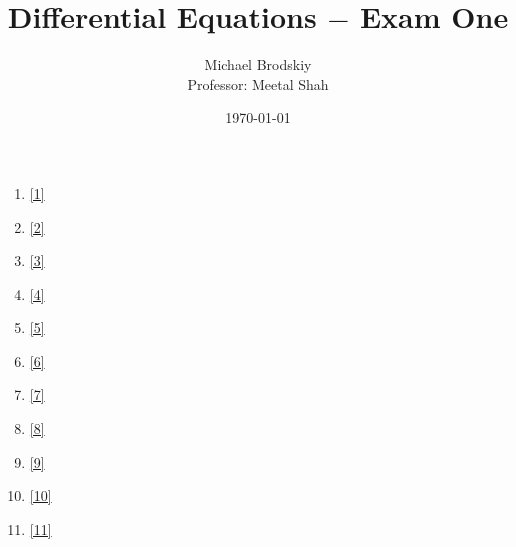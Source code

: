 \documentclass[12pt]{article}
\title{Differential Equations $-$ Exam One}
\date{\today}
\author{Michael Brodskiy\\ \small Professor: Meetal Shah}
\begin{document}
\maketitle

\begin{enumerate}

  \item \eqref{1}

  \item \eqref{2}

  \item \eqref{3}

  \item \eqref{4} 

  \item \eqref{5}

  \item \eqref{6}

  \item \eqref{7}

  \item \eqref{8}

  \item \eqref{9}

  \item \eqref{10}

  \item \eqref{11}

\end{enumerate}

\hline
\begin{equation}
  \begin{split}
  \end{split}
  \label{1}
\end{equation}
\hline

\begin{equation}
  \begin{split}
  \end{split}
  \label{2}
\end{equation}

\hline
\begin{equation}
  \begin{split}
  \end{split}
  \label{3}
\end{equation}

\hline
\begin{equation}
  \begin{split}
  \end{split}
  \label{4}
\end{equation}
\end{document}
